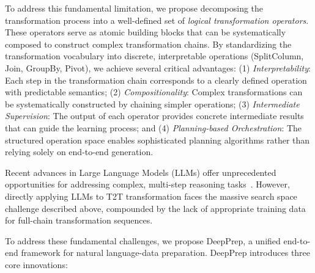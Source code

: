 To address this fundamental limitation, we propose decomposing the transformation process into a well-defined set of \textit{logical transformation operators}. These operators serve as atomic building blocks that can be systematically composed to construct complex transformation chains. By standardizing the transformation vocabulary into discrete, interpretable operations (\eg SplitColumn, Join, GroupBy, Pivot), we achieve several critical advantages: (1) \textit{Interpretability}: Each step in the transformation chain corresponds to a clearly defined operation with predictable semantics; (2) \textit{Compositionality}: Complex transformations can be systematically constructed by chaining simpler operations; (3) \textit{Intermediate Supervision}: The output of each operator provides concrete intermediate results that can guide the learning process; and (4) \textit{Planning-based Orchestration}: The structured operation space enables sophisticated planning algorithms rather than relying solely on end-to-end generation.

 Recent advances in Large Language Models (LLMs) offer unprecedented opportunities for addressing complex, multi-step reasoning tasks~\cite{zhang2025reward}. However, directly applying LLMs to T2T transformation faces the massive search space challenge described above, compounded by the lack of appropriate training data for full-chain transformation sequences.

 To address these fundamental challenges, we propose DeepPrep, a unified end-to-end framework for natural language-\nlwhat data preparation. DeepPrep introduces three core innovations:



